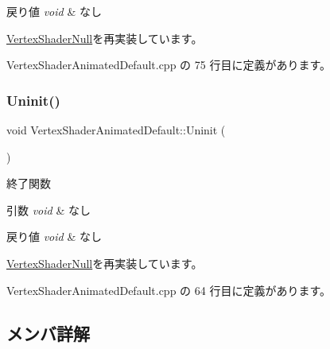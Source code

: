 \begin{DoxyRetVals}{戻り値}
{\em void} & なし \\
\hline
\end{DoxyRetVals}


\mbox{\hyperlink{class_vertex_shader_null_aae3231bb3fa5df2578ba89701867ffb3}{Vertex\+Shader\+Null}}を再実装しています。



 Vertex\+Shader\+Animated\+Default.\+cpp の 75 行目に定義があります。

\mbox{\label{class_vertex_shader_animated_default_a683f221e9b70d13fdb63e7b8fb15f31c}} 
\subsubsection{\texorpdfstring{Uninit()}{Uninit()}}
{\footnotesize\ttfamily void Vertex\+Shader\+Animated\+Default\+::\+Uninit (\begin{DoxyParamCaption}{ }\end{DoxyParamCaption})\hspace{0.3cm}{\ttfamily [virtual]}}



終了関数 


\begin{DoxyParams}{引数}
{\em void} & なし \\
\hline
\end{DoxyParams}

\begin{DoxyRetVals}{戻り値}
{\em void} & なし \\
\hline
\end{DoxyRetVals}


\mbox{\hyperlink{class_vertex_shader_null_adf758f295d2803c6d8bd7e05e461abec}{Vertex\+Shader\+Null}}を再実装しています。



 Vertex\+Shader\+Animated\+Default.\+cpp の 64 行目に定義があります。



\subsection{メンバ詳解}
\mbox{\label{class_vertex_shader_animated_default_a5e353de337ad6ad59b3632cd3bff8605}} 
